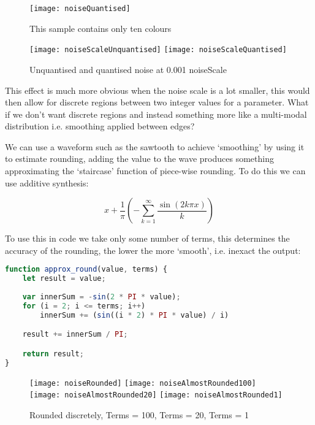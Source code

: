 \begin{figure}[H]
\centering
\texttt{[image: noiseQuantised]}
\caption{This sample contains only ten colours}
\end{figure}

\begin{figure}[H]
\centering
\texttt{[image: noiseScaleUnquantised]}
\hspace{0.2cm}
\texttt{[image: noiseScaleQuantised]}
\caption{Unquantised and quantised noise at 0.001 noiseScale}
\label{0.001scale}
\end{figure}

This effect is much more obvious when the noise scale is a lot smaller, this
would then allow for discrete regions between two integer values for a
parameter. What if we don't want discrete regions and instead something more
like a multi-modal distribution i.e. smoothing applied between edges?

We can use a waveform such as the sawtooth to achieve `smoothing' by using it to
estimate rounding, adding the value to the wave produces something approximating
the `staircase' function of piece-wise rounding. To do this we can use additive
synthesis:

$$x + \frac{1}{\pi} (-\sum^\infty_{k=1} \frac{\sin(2k \pi x)}{k})$$

To use this in code we take only some number of terms, this determines the
accuracy of the rounding, the lower the more `smooth', i.e. inexact the output:
\begin{lstlisting}[language=JavaScript]
function approx_round(value, terms) {
    let result = value;
    
    var innerSum = -sin(2 * PI * value);
    for (i = 2; i <= terms; i++)
        innerSum += (sin((i * 2) * PI * value) / i)

    result += innerSum / PI;

    return result;
}
\end{lstlisting}

\begin{figure}[H]
\centering
\texttt{[image: noiseRounded]}
\hspace{0.2cm}
\texttt{[image: noiseAlmostRounded100]}
\hspace{0.2cm}
\texttt{[image: noiseAlmostRounded20]}
\hspace{0.2cm}
\texttt{[image: noiseAlmostRounded1]}
\caption{Rounded discretely, Terms = 100, Terms = 20, Terms = 1}
\end{figure}

